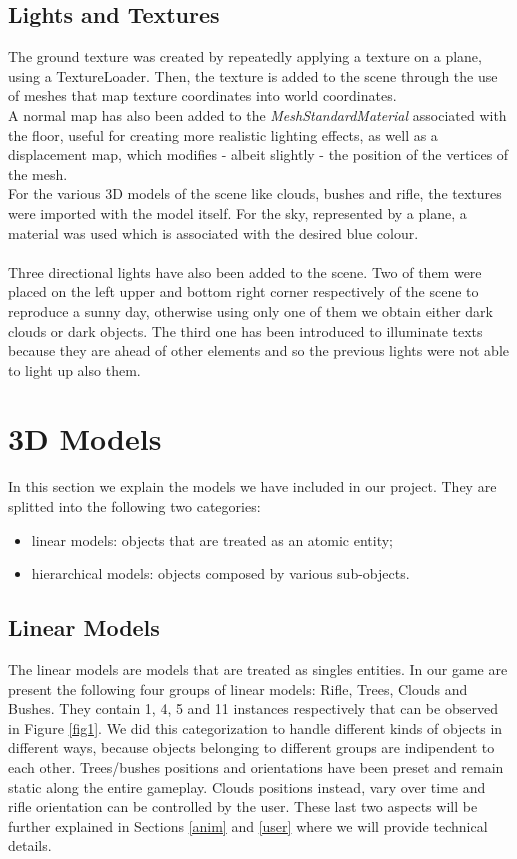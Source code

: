 \documentclass[12pt,a4paper]{article}
\begin{document}
	\subsection{Lights and Textures}
	The ground texture was created by repeatedly applying a texture on 
	a plane, using a TextureLoader. Then, the texture is added to the
	scene through the use of meshes that map texture coordinates into
	world coordinates.\\
	A normal map has also been added to the \textit{MeshStandardMaterial} 
	associated with the floor, useful for creating more realistic lighting 
	effects, as well as a displacement map, which modifies - albeit 
	slightly - the position of the vertices of the mesh.\\
	For the various 3D models of the scene like clouds, bushes and rifle, 
	the textures were imported with the model itself. For the sky, 
	represented by a plane, a material was 
	used which is associated with the desired blue colour.\\\\
	Three directional lights have also been added to the scene. 
	Two of them were placed on the left upper and bottom right corner 
	respectively of the scene to reproduce a sunny day, otherwise using
	only one of them we obtain either dark clouds or dark objects. 
	The third one has been introduced to illuminate texts because they 
	are ahead of other elements and so the previous lights were
	not able to light up also them.
	\section{3D Models}
	In this section we explain the models we have included in our project. They are splitted into
	the following two categories: 
	\begin{itemize}
		\item linear models: objects that are treated as an atomic entity;
		\item hierarchical models: objects composed by various sub-objects. 
	\end{itemize}
	\subsection{Linear Models} \label{linear}
	The linear models are models that are treated as singles entities. In our game are present the following four groups of linear models: Rifle, Trees, Clouds and Bushes. They contain 1, 4, 5 and 11 instances respectively that can be observed in Figure \ref{fig1}. We did this categorization to handle different kinds of objects in different ways, because objects belonging to different groups are indipendent to each other. Trees/bushes positions and orientations have been preset and remain static along the entire gameplay. Clouds positions instead, vary over time and rifle orientation can be controlled by the user. These last two aspects will be further explained in Sections \ref{anim} and \ref{user} where we will provide technical details.
\end{document}
